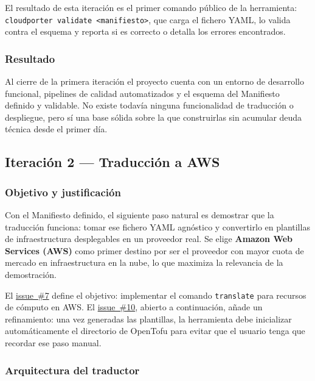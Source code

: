 El resultado de esta iteración es el primer comando público de la herramienta:
\texttt{cloudporter validate <manifiesto>}, que carga el fichero YAML, lo valida contra el esquema
y reporta si es correcto o detalla los errores encontrados.

\subsubsection{Resultado}

Al cierre de la primera iteración el proyecto cuenta con un entorno de desarrollo funcional,
pipelines de calidad automatizados y el esquema del Manifiesto definido y validable. No existe
todavía ninguna funcionalidad de traducción o despliegue, pero sí una base sólida sobre la
que construirlas sin acumular deuda técnica desde el primer día.

\subsection{Iteración 2 — Traducción a AWS}
\label{sec:iter2}

\subsubsection{Objetivo y justificación}

Con el Manifiesto definido, el siguiente paso natural es demostrar que la traducción funciona:
tomar ese fichero YAML agnóstico y convertirlo en plantillas de infraestructura desplegables
en un proveedor real. Se elige \textbf{Amazon Web Services (AWS)} como primer destino por ser
el proveedor con mayor cuota de mercado en infraestructura en la nube, lo que maximiza la
relevancia de la demostración.

El \href{https://github.com/lucpez/cloudporter/issues/7}{issue~\#7} define el objetivo: implementar el comando \texttt{translate} para recursos de
cómputo en AWS. El \href{https://github.com/lucpez/cloudporter/issues/10}{issue~\#10}, abierto a continuación, añade un refinamiento: una vez
generadas las plantillas, la herramienta debe inicializar automáticamente el directorio de
OpenTofu para evitar que el usuario tenga que recordar ese paso manual.

\subsubsection{Arquitectura del traductor}

